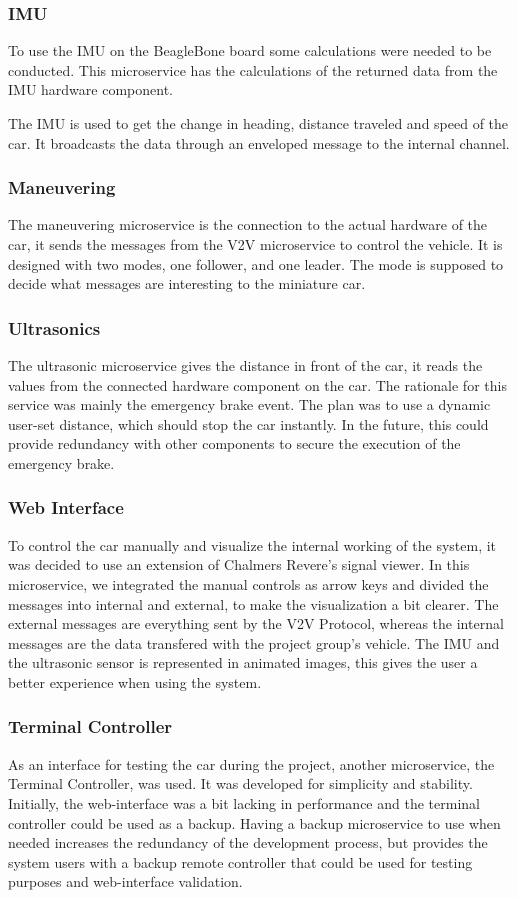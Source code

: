 \documentclass[12pt]{article}
\begin{document}
\subsubsection{IMU}
To use the IMU on the BeagleBone board some calculations were needed to be conducted. This microservice has the calculations of the returned data from the IMU hardware component.  

The IMU is used to get the change in heading, distance traveled and speed of the car. It broadcasts the data through an enveloped message to the internal channel. 
\subsubsection{Maneuvering}
The maneuvering microservice is the connection to the actual hardware of the car, it sends the messages from the V2V microservice to control the vehicle. It is designed with two modes, one follower, and one leader. The mode is supposed to decide what messages are interesting to the miniature car.
\subsubsection{Ultrasonics}
The ultrasonic microservice gives the distance in front of the car, it reads the values from the connected hardware component on the car. The rationale for this service was mainly the emergency brake event. The plan was to use a dynamic user-set distance, which should stop the car instantly. In the future, this could provide redundancy with other components to secure the execution of the emergency brake.
\subsubsection{Web Interface}
To control the car manually and visualize the internal working of the system, it was decided to use an extension of Chalmers Revere's signal viewer\cite{signal viewer}. In this microservice, we integrated the manual controls as arrow keys and divided the messages into internal and external, to make the visualization a bit clearer. The external messages are everything sent by the V2V Protocol, whereas the internal messages are the data transfered with the project group's vehicle. The IMU and the ultrasonic sensor is represented in animated images, this gives the user a better experience when using the system.  
\subsubsection{Terminal Controller}
As an interface for testing the car during the project, another microservice, the Terminal Controller, was used. It was developed for simplicity and stability. Initially, the web-interface was a bit lacking in performance and the terminal controller could be used as a backup. Having a backup microservice to use when needed increases the redundancy of the development process, but provides the system users with a backup remote controller that could be used for testing purposes and web-interface validation. 
\end{document}
